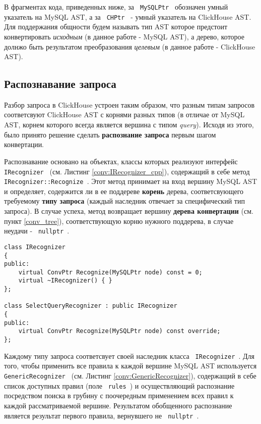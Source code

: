 В фрагментах кода, приведенных ниже, за \texttt{ MySQLPtr } обозначен умный указатель на MySQL AST, а за \texttt{ CHPtr } - умный указатель на ClickHouse AST. Для поддержания общности будем называть тип AST которое предстоит конвертировать \textit{исходным} (в данное работе - MySQL AST), а дерево, которое долнжо быть результатом преобразования \textit{целевым} (в данное работе - ClickHouse AST).

\subsection{Распознавание запроса}
Разбор запроса в ClickHouse устроен таким образом, что разным типам запросов соответсвуют ClickHouse AST с корнями разных типов (в отличае от MySQL AST, корнем которого всегда является вершина с типом \textit{query}). Исходя из этого, было принято решение сделать \textbf{распознание запроса} первым шагом конвертации.

Распознавание основано на объектах, классы которых реализуют интерфейс \texttt{ IRecognizer } (см. Листинг \ref{conv:IRecognizer_cpp}), содержащий в себе метод \texttt{ IRecognizer::Recognize }. Этот метод принимает на вход вершину MySQL AST и определяет, содержится ли в ее поддереве \textbf{корень} дерева, соответсвующего требуемому \textbf{типу запроса} (каждый наследник отвечает за специфический тип запроса). В случае успеха, метод возвращает вершину \textbf{дерева конвертации} (см. пункт \ref{conv_tree}), соответствующую корню нужного поддерева, в случае неудачи - \texttt{ nullptr }.

\begin{code}
    \label{conv:IRecognizer_cpp}
    \begin{verbatim}
class IRecognizer
{
public:
    virtual ConvPtr Recognize(MySQLPtr node) const = 0;
    virtual ~IRecognizer() { }
};

class SelectQueryRecognizer : public IRecognizer
{
public:
    virtual ConvPtr Recognize(MySQLPtr node) const override;
};
    \end{verbatim}
\end{code}

Каждому типу запроса соответсвует своей наследник класса \texttt{ IRecognizer }. Для того, чтобы применить все правила к каждой вершине MySQL AST используется \texttt{ GenericRecognizer } (см. Листинг \ref{conv:GenericRecognizer}), содержащий в себе список доступных правил (поле \texttt{ rules }) и осуществляющий распознание посредством поиска в грубину с поочередным применением всех правил к каждой рассматриваемой вершине. Результатом обобщенного распознание является результат первого правила, вернувшего не \texttt{ nullptr }. 

